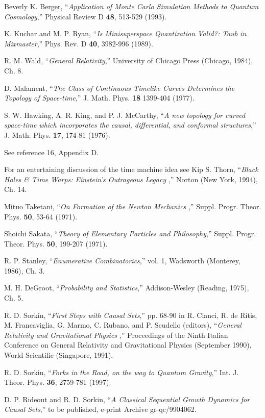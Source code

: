 \begin{references}
  Beverly K. Berger, ``{\it Application of Monte Carlo
Simulation Methods to Quantum Cosmology},'' Physical Review D {\bf 48},
513-529 (1993).

  K. Kuchar and M. P. Ryan, ``{\it Is Minisuperspace
Quantization Valid?: Taub in Mixmaster},'' Phys. Rev. D {\bf 40}, 3982-996
(1989).

  R. M. Wald, ``{\it General Relativity},'' University of
Chicago Press (Chicago, 1984), Ch. 8.

  D. Malament, ``{\it The Class of Continuous Timelike Curves
Determines the Topology of Space-time},'' J. Math. Phys. {\bf 18} 1399-404
(1977).

  S. W. Hawking, A. R. King, and P. J. McCarthy, ``{\it A new
topology for curved space-time which incorporates the causal, differential,
and conformal structures},'' J. Math. Phys. {\bf 17}, 174-81 (1976).

  See reference 16, Appendix D.

  For an entertaining discussion of the time machine idea see
Kip S. Thorn, ``{\it Black Holes \& Time Warps: Einstein's Outrageous Legacy}%
,'' Norton (New York, 1994), Ch. 14.

  Mituo Taketani, ``{\it On Formation of the Newton Mechanics}%
,'' Suppl. Progr. Theor. Phys. {\bf 50}, 53-64 (1971).

  Shoichi Sakata, ``{\it Theory of Elementary Particles and
Philosophy},'' Suppl. Progr. Theor. Phys. {\bf 50}, 199-207 (1971).

  R. P. Stanley, ``{\it Enumerative Combinatorics},'' vol. 1,
Wadsworth (Monterey, 1986), Ch. 3.

  M. H. DeGroot, ``{\it Probability and Statistics},''
Addison-Wesley (Reading, 1975), Ch. 5.

  R. D. Sorkin, ``{\it First Steps with Causal Sets},'' pp.
68-90 in R. Cianci, R. de Ritis, M. Francaviglia, G. Marmo, C. Rubano, and
P. Scudello (editors), ``{\it General Relativity and Gravitational Physics}%
,'' Proceedings of the Ninth Italian Conference on General Relativity and
Gravitational Physics (September 1990), World Scientific (Singapore, 1991).

  R. D. Sorkin, ``{\it Forks in the Road, on the way to Quantum
Gravity},'' Int. J. Theor. Phys. {\bf 36}, 2759-781 (1997).

  D. P. Rideout and R. D. Sorkin, ``{\it A Classical Sequential
Growth Dynamics for Causal Sets},'' to be published, e-print Archive
gr-qc/9904062.


\end{references}
